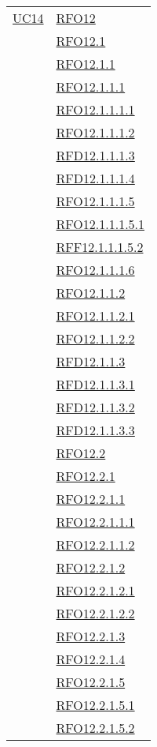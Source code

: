 \begin{longtable}{|>{\centering}m{5cm}|m{5cm}<{\centering}|}
\hyperlink{UC14}{UC14} 
& \hyperlink{RFO12}{RFO12}\\
& \hyperlink{RFO12.1}{RFO12.1}\\
& \hyperlink{RFO12.1.1}{RFO12.1.1}\\
& \hyperlink{RFO12.1.1.1}{RFO12.1.1.1}\\
& \hyperlink{RFO12.1.1.1.1}{RFO12.1.1.1.1}\\
& \hyperlink{RFO12.1.1.1.2}{RFO12.1.1.1.2}\\
& \hyperlink{RFD12.1.1.1.3}{RFD12.1.1.1.3}\\
& \hyperlink{RFD12.1.1.1.4}{RFD12.1.1.1.4}\\
& \hyperlink{RFO12.1.1.1.5}{RFO12.1.1.1.5}\\
& \hyperlink{RFO12.1.1.1.5.1}{RFO12.1.1.1.5.1}\\
& \hyperlink{RFF12.1.1.1.5.2}{RFF12.1.1.1.5.2}\\
& \hyperlink{RFO12.1.1.1.6}{RFO12.1.1.1.6}\\
& \hyperlink{RFO12.1.1.2}{RFO12.1.1.2}\\
& \hyperlink{RFO12.1.1.2.1}{RFO12.1.1.2.1}\\
& \hyperlink{RFO12.1.1.2.2}{RFO12.1.1.2.2}\\
& \hyperlink{RFD12.1.1.3}{RFD12.1.1.3}\\
& \hyperlink{RFD12.1.1.3.1}{RFD12.1.1.3.1}\\
& \hyperlink{RFD12.1.1.3.2}{RFD12.1.1.3.2}\\
& \hyperlink{RFD12.1.1.3.3}{RFD12.1.1.3.3}\\
& \hyperlink{RFO12.2}{RFO12.2}\\
& \hyperlink{RFO12.2.1}{RFO12.2.1}\\
& \hyperlink{RFO12.2.1.1}{RFO12.2.1.1}\\
& \hyperlink{RFO12.2.1.1.1}{RFO12.2.1.1.1}\\
& \hyperlink{RFO12.2.1.1.2}{RFO12.2.1.1.2}\\
& \hyperlink{RFO12.2.1.2}{RFO12.2.1.2}\\
& \hyperlink{RFO12.2.1.2.1}{RFO12.2.1.2.1}\\
& \hyperlink{RFO12.2.1.2.2}{RFO12.2.1.2.2}\\
& \hyperlink{RFO12.2.1.3}{RFO12.2.1.3}\\
& \hyperlink{RFO12.2.1.4}{RFO12.2.1.4}\\
& \hyperlink{RFO12.2.1.5}{RFO12.2.1.5}\\
& \hyperlink{RFO12.2.1.5.1}{RFO12.2.1.5.1}\\
& \hyperlink{RFO12.2.1.5.2}{RFO12.2.1.5.2}\\


\end{longtable}

